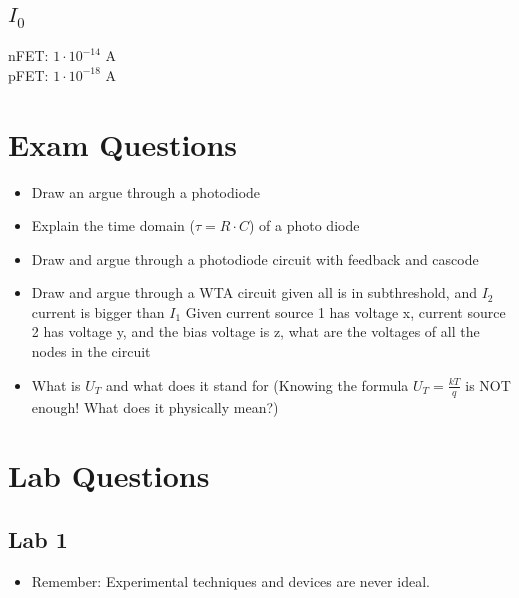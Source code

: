 \subsection{$I_0$}
nFET: $1\cdot10^{-14}$ A\\
pFET: $1\cdot10^{-18}$ A


\section{Exam Questions}
\begin{itemize}
\item Draw an argue through a photodiode
\item Explain the time domain ($\tau = R\cdot C$) of a photo diode
\item Draw and argue through a photodiode circuit with feedback and cascode
\item Draw and argue through a WTA circuit given all is in subthreshold, and $I_2$ current is bigger than $I_1$
\subitem Given current source 1 has voltage x, current source 2 has voltage y, and the bias voltage is z, what are the voltages of all the nodes in the circuit
\item What is $U_T$ and what does it stand for (Knowing the formula $U_T=\frac{kT}{q}$ is NOT enough! What does it physically mean?)
\end{itemize}


\section{Lab Questions}
\subsection{Lab 1}
\begin{itemize}
\item Remember: Experimental techniques and devices are never ideal.
\end{itemize}

